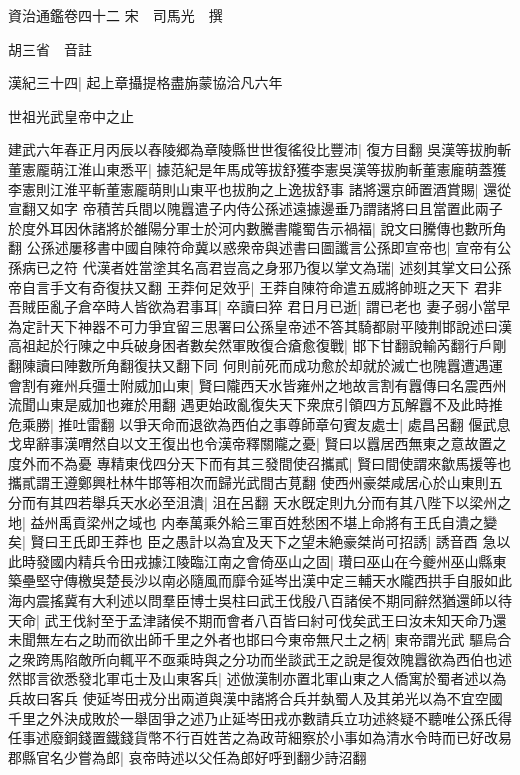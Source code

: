 資治通鑑卷四十二
宋　司馬光　撰

胡三省　音註

漢紀三十四|{
	起上章攝提格盡旃蒙協洽凡六年}


世祖光武皇帝中之止

建武六年春正月丙辰以舂陵郷為章陵縣世世復徭役比豐沛|{
	復方目翻}
吳漢等拔胊斬董憲龎萌江淮山東悉平|{
	據范紀是年馬成等拔舒獲李憲吳漢等拔朐斬董憲龐萌蓋獲李憲則江淮平斬董憲龎萌則山東平也拔胊之上逸拔舒事}
諸將還京師置酒賞賜|{
	還從宣翻又如字}
帝積苦兵間以隗囂遣子内侍公孫述遠據邊垂乃謂諸將曰且當置此兩子於度外耳因休諸將於雒陽分軍士於河内數騰書隴蜀告示禍福|{
	說文曰騰傳也數所角翻}
公孫述屢移書中國自陳符命冀以惑衆帝與述書曰圖讖言公孫即宣帝也|{
	宣帝有公孫病已之符}
代漢者姓當塗其名高君豈高之身邪乃復以掌文為瑞|{
	述刻其掌文曰公孫帝自言手文有奇復扶又翻}
王莽何足效乎|{
	王莽自陳符命遣五威將帥班之天下}
君非吾賊臣亂子倉卒時人皆欲為君事耳|{
	卒讀曰猝}
君日月已逝|{
	謂已老也}
妻子弱小當早為定計天下神器不可力爭宜留三思署曰公孫皇帝述不答其騎都尉平陵荆邯說述曰漢高祖起於行陳之中兵破身困者數矣然軍敗復合瘡愈復戰|{
	邯下甘翻說輸芮翻行戶剛翻陳讀曰陣數所角翻復扶又翻下同}
何則前死而成功愈於却就於滅亡也隗囂遭遇運會割有雍州兵彊士附威加山東|{
	賢曰隴西天水皆雍州之地故言割有囂傳曰名震西州流聞山東是威加也雍於用翻}
遇更始政亂復失天下衆庶引領四方瓦解囂不及此時推危乘勝|{
	推吐雷翻}
以爭天命而退欲為西伯之事尊師章句賓友處士|{
	處昌呂翻}
偃武息戈卑辭事漢喟然自以文王復出也令漢帝釋關隴之憂|{
	賢曰以囂居西無東之意故置之度外而不為憂}
專精東伐四分天下而有其三發間使召攜貳|{
	賢曰間使謂來歙馬援等也攜貳謂王遵鄭興杜林牛邯等相次而歸光武間古莧翻}
使西州豪桀咸居心於山東則五分而有其四若舉兵天水必至沮潰|{
	沮在呂翻}
天水旣定則九分而有其八陛下以梁州之地|{
	益州禹貢梁州之域也}
内奉萬乘外給三軍百姓愁困不堪上命將有王氏自潰之變矣|{
	賢曰王氏即王莽也}
臣之愚計以為宜及天下之望未絶豪桀尚可招誘|{
	誘音酉}
急以此時發國内精兵令田戎據江陵臨江南之會倚巫山之固|{
	瓚曰巫山在今夔州巫山縣東}
築壘堅守傳檄吳楚長沙以南必隨風而靡令延岑出漢中定三輔天水隴西拱手自服如此海内震搖冀有大利述以問羣臣博士吳柱曰武王伐殷八百諸侯不期同辭然猶還師以待天命|{
	武王伐紂至于孟津諸侯不期而會者八百皆曰紂可伐矣武王曰汝未知天命乃還}
未聞無左右之助而欲出師千里之外者也邯曰今東帝無尺土之柄|{
	東帝謂光武}
驅烏合之衆跨馬陷敵所向輒平不亟乘時與之分功而坐談武王之說是復效隗囂欲為西伯也述然邯言欲悉發北軍屯士及山東客兵|{
	述倣漢制亦置北軍山東之人僑寓於蜀者述以為兵故曰客兵}
使延岑田戎分出兩道與漢中諸將合兵并埶蜀人及其弟光以為不宜空國千里之外決成敗於一舉固爭之述乃止延岑田戎亦數請兵立功述終疑不聽唯公孫氏得任事述廢銅錢置鐵錢貨幣不行百姓苦之為政苛細察於小事如為清水令時而已好改易郡縣官名少嘗為郎|{
	哀帝時述以父任為郎好呼到翻少詩沼翻}
